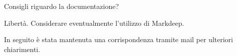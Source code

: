 \begin{spacing}{2}
\end{spacing}

\begin{minipage}[c]{0.47\textwidth}
\centering
Consigli riguardo la documentazione?
\end{minipage}
\hfill
\begin{minipage}[c]{0.47\textwidth}
\centering
Libertà. Considerare eventualmente l’utilizzo di Markdeep.
\end{minipage}

\begin{spacing}{3}
\end{spacing}

In seguito è stata mantenuta una corrispondenza tramite mail per ulteriori chiarimenti.
